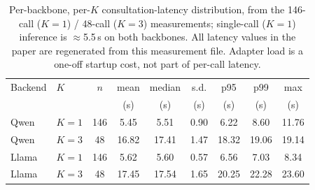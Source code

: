 \begin{table}[t]
\centering\small
\caption{Per-backbone, per-$K$ consultation-latency distribution, from the
146-call ($K{=}1$) / 48-call ($K{=}3$) measurements; single-call ($K{=}1$)
inference is $\approx$5.5\,s on both backbones. All latency values in the paper
are regenerated from this measurement file. Adapter load is a one-off startup
cost, not part of per-call latency.}
\label{tab:latency-v3}
\begin{tabular}{llccccccc}
\toprule
Backend & $K$ & $n$ & mean & median & s.d. & p95 & p99 & max \\
 & & & (s) & (s) & (s) & (s) & (s) & (s) \\
\midrule
Qwen & $K{=}1$ & 146 & 5.45 & 5.51 & 0.90 & 6.22 & 8.60 & 11.76 \\
Qwen & $K{=}3$ & 48 & 16.82 & 17.41 & 1.47 & 18.32 & 19.06 & 19.14 \\
Llama & $K{=}1$ & 146 & 5.62 & 5.60 & 0.57 & 6.56 & 7.03 & 8.34 \\
Llama & $K{=}3$ & 48 & 17.45 & 17.54 & 1.65 & 20.25 & 22.28 & 23.60 \\
\bottomrule
\end{tabular}
\end{table}
